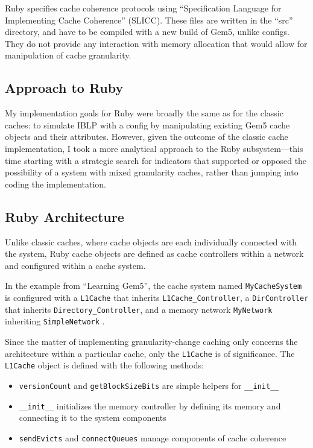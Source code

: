 \documentclass[12pt,twoside]{reedthesis}
\begin{document}
	Ruby specifies cache coherence protocols using ``Specification Language for Implementing Cache Coherence'' (SLICC). These files are written in the ``src'' directory, and have to be compiled with a new build of Gem5, unlike configs. They do not provide any interaction with memory allocation that would allow for manipulation of cache granularity.

	\subsection*{Approach to Ruby}

	My implementation goals for Ruby were broadly the same as for the classic caches: to simulate IBLP with a config by manipulating existing Gem5 cache objects and their attributes. However, given the outcome of the classic cache implementation, I took a more analytical approach to the Ruby subsystem---this time starting with a strategic search for indicators that supported or opposed the possibility of a system with mixed granularity caches, rather than jumping into coding the implementation.

	\subsection*{Ruby Architecture}

	Unlike classic caches, where cache objects are each individually connected with the system, Ruby cache objects are defined as cache controllers within a network and configured within a cache system.
	
	In the example from ``Learning Gem5'', the cache system named \verb`MyCacheSystem` is configured with a \verb`L1Cache` that inherits \verb`L1Cache_Controller`, a \verb`DirController` that inherits \verb`Directory_Controller`, and a memory network \verb`MyNetwork` inheriting \verb`SimpleNetwork` \cite{gem5-tutorial}.

	Since the matter of implementing granularity-change caching only concerns the architecture within a particular cache, only the \verb`L1Cache` is of significance. The \verb`L1Cache` object is defined with the following methods: \begin{itemize}
		\item \verb`versionCount` and \verb`getBlockSizeBits` are simple helpers for \verb`__init__`
		\item \verb`__init__` initializes the memory controller by defining its memory and connecting it to the system components
		\item \verb`sendEvicts` and \verb`connectQueues` manage components of cache coherence
	\end{itemize}
\end{document}
